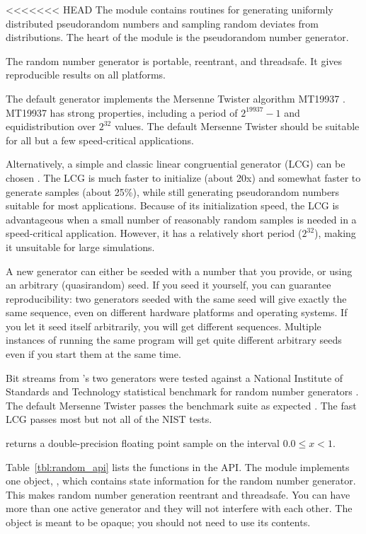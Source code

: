 <<<<<<< HEAD
The  module contains routines for generating uniformly
distributed pseudorandom numbers and sampling random deviates from
distributions. The heart of the module is the 
pseudorandom number generator.

The  random number generator is portable,
reentrant, and threadsafe. It gives reproducible results on all
platforms.

The default  generator implements the Mersenne
Twister algorithm MT19937 \citep{Matsumoto98}. MT19937 has strong
properties, including a period of $2^{19937}-1$ and equidistribution
over $2^{32}$ values. The default Mersenne Twister should be suitable
for all but a few speed-critical applications.

Alternatively, a simple and classic linear congruential generator
(LCG) can be chosen \citep{Knu-81a}. The LCG is much faster to
initialize (about 20x) and somewhat faster to generate samples (about
25\%), while still generating pseudorandom numbers suitable for most
applications. Because of its initialization speed, the LCG is
advantageous when a small number of reasonably random samples is
needed in a speed-critical application. However, it has a relatively
short period ($2^32$), making it unsuitable for large simulations.

A new generator can either be seeded with a number that you provide,
or using an arbitrary (quasirandom) seed. If you seed it yourself, you
can guarantee reproducibility: two generators seeded with the same
seed will give exactly the same sequence, even on different hardware
platforms and operating systems. If you let it seed itself
arbitrarily, you will get different sequences. Multiple instances of
running the same program will get quite different arbitrary seeds even
if you start them at the same time.

Bit streams from 's two generators were tested
against a National Institute of Standards and Technology statistical
benchmark for random number generators \citep{NIST08}.  The default
Mersenne Twister passes the benchmark suite as expected
\citep{Matsumoto98}. The fast LCG passes most but not all of the NIST
tests.

 returns a double-precision floating point sample
on the interval $0.0 \leq x < 1$. 

Table~\ref{tbl:random_api} lists the functions in the 
API. The module implements one object, , which
contains state information for the random number generator.  This
makes random number generation reentrant and threadsafe. You can have
more than one active generator and they will not interfere with each
other. The object is meant to be opaque; you should not need to use
its contents.  




